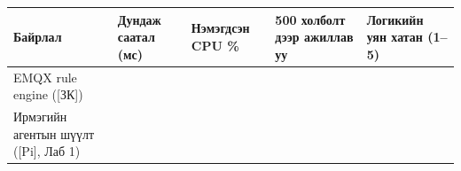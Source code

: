 \begingroup\scriptsize\begin{longtable}[]{@{}lllll@{}}
\toprule
\begin{minipage}[b]{0.17\columnwidth}\raggedright
Байрлал\strut
\end{minipage} & \begin{minipage}[b]{0.17\columnwidth}\raggedright
Дундаж саатал (мс)\strut
\end{minipage} & \begin{minipage}[b]{0.17\columnwidth}\raggedright
Нэмэгдсэн CPU \%\strut
\end{minipage} & \begin{minipage}[b]{0.17\columnwidth}\raggedright
500 холболт дээр ажиллав уу\strut
\end{minipage} & \begin{minipage}[b]{0.17\columnwidth}\raggedright
Логикийн уян хатан (1--5)\strut
\end{minipage}\tabularnewline
\midrule
\endhead
\begin{minipage}[t]{0.17\columnwidth}\raggedright
EMQX rule engine ({[}ЗК{]})\strut
\end{minipage} & \begin{minipage}[t]{0.17\columnwidth}\raggedright
\strut
\end{minipage} & \begin{minipage}[t]{0.17\columnwidth}\raggedright
\strut
\end{minipage} & \begin{minipage}[t]{0.17\columnwidth}\raggedright
\strut
\end{minipage} & \begin{minipage}[t]{0.17\columnwidth}\raggedright
\strut
\end{minipage}\tabularnewline
\begin{minipage}[t]{0.17\columnwidth}\raggedright
Ирмэгийн агентын шүүлт ({[}Pi{]}, Лаб 1)\strut
\end{minipage} & \begin{minipage}[t]{0.17\columnwidth}\raggedright
\strut
\end{minipage} & \begin{minipage}[t]{0.17\columnwidth}\raggedright
\strut
\end{minipage} & \begin{minipage}[t]{0.17\columnwidth}\raggedright
\strut
\end{minipage} & \begin{minipage}[t]{0.17\columnwidth}\raggedright
\strut
\end{minipage}\tabularnewline

\end{longtable}
